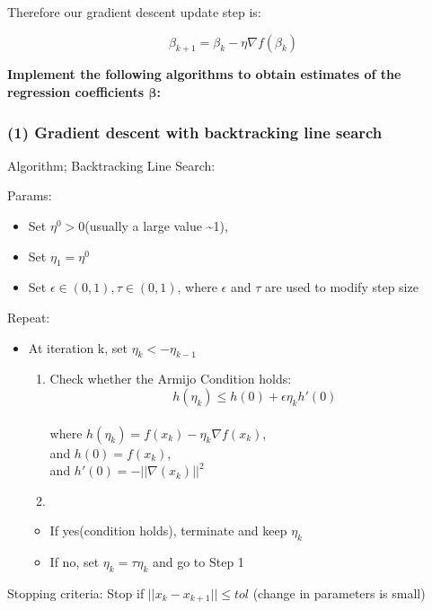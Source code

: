 \documentclass[
  letterpaper,
  DIV=11,
  numbers=noendperiod]{scrartcl}
\providecommand{\tightlist}{%
  \setlength{\itemsep}{0pt}\setlength{\parskip}{0pt}}\usepackage{longtable,booktabs,array}
\begin{document}
Therefore our gradient descent update step is:

\[
\boxed {\beta_{k+1} = \beta_k - \eta \nabla f(\beta_k)}
\]

\textbf{Implement the following algorithms to obtain estimates of the
regression coefficients \(\symbf{β}\):}

\subsubsection{(1) Gradient descent with backtracking line
search}\label{gradient-descent-with-backtracking-line-search}

Algorithm; Backtracking Line Search:

Params:

\begin{itemize}
\tightlist
\item
  Set \(η^0 > 0\)(usually a large value \textasciitilde1),
\item
  Set \(η_1 = η^0\)
\item
  Set \(ϵ ∈ (0,1), τ ∈ (0,1)\), where \(ϵ\) and \(τ\) are used to modify
  step size
\end{itemize}

Repeat:

\begin{itemize}
\tightlist
\item
  At iteration k, set \(η_k <- η_{k-1}\)

  \begin{enumerate}
  \def\labelenumi{\arabic{enumi}.}
  \item
    Check whether the Armijo Condition holds: \[
    h(η_k) ≤ h(0) + ϵη_kh'(0)
    \]\\
    where \(h(η_k) = f(x_k) − η_k ∇f(x_k)\),\\
    and \(h(0) = f(x_k)\),\\
    and \(h'(0) = -||\nabla (x_k)||^2\)
  \item
  \end{enumerate}

  \begin{itemize}
  \tightlist
  \item
    If yes(condition holds), terminate and keep \(η_k\)
  \item
    If no, set \(η_k = τη_k\) and go to Step 1
  \end{itemize}
\end{itemize}

Stopping criteria: Stop if \(||x_k - x_{k+1}|| ≤ tol\) (change in
parameters is small)
\end{document}
